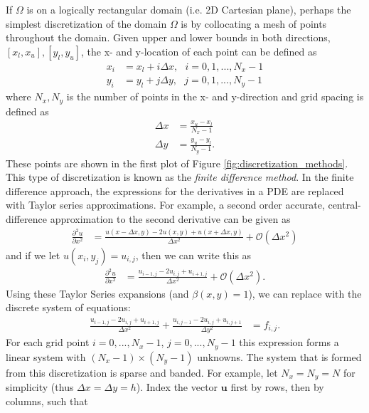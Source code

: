 If $\Omega$ is on a logically rectangular domain (i.e. 2D Cartesian plane), perhaps the simplest discretization of the domain $\Omega$ is by collocating a mesh of points throughout the domain. Given upper and lower bounds in both directions, $[x_l, x_u], [y_l, y_u]$, the x- and y-location of each point can be defined as
\begin{align}
    x_i &= x_l + i \Delta x,\ \ \ i = 0, 1, ..., N_x-1 \\
    y_i &= y_l + j \Delta y,\ \ \ j = 0, 1, ..., N_y-1
\end{align}
where $N_x, N_y$ is the number of points in the x- and y-direction and grid spacing is defined as
\begin{align}
    \Delta x &= \frac{x_u - x_l}{N_x - 1} \\
    \Delta y &= \frac{y_u - y_l}{N_y - 1}.
\end{align}
These points are shown in the first plot of Figure \ref{fig:discretization_methods}. This type of discretization is known as the {\em finite difference method}. In the finite difference approach, the expressions for the derivatives in a PDE are replaced with Taylor series approximations. For example, a second order accurate, central-difference approximation to the second derivative can be given as
\begin{align}
    \frac{\partial^2 u}{\partial x^2} &= \frac{u(x - \Delta x, y) - 2u(x, y) + u(x + \Delta x, y)}{\Delta x^2} + \mathcal{O}(\Delta x^2)
\end{align}
and if we let $u(x_i, y_j) = u_{i,j}$, then we can write this as
\begin{align}
    \frac{\partial^2 u}{\partial x^2} &= \frac{u_{i-1,j} - 2u_{i,j} + u_{i+1,j}}{\Delta x^2} + \mathcal{O}(\Delta x^2).
\end{align}
Using these Taylor Series expansions (and $\beta(x,y) = 1$), we can replace  with the discrete system of equations:
\begin{align}
    \frac{u_{i-1,j} - 2u_{i,j} + u_{i+1,j}}{\Delta x^2} + \frac{u_{i,j-1} - 2u_{i,j} + u_{i,j+1}}{\Delta y^2} &= f_{i,j}.
    \label{eq:poisson_FD}
\end{align}
For each grid point $i = 0, ..., N_x - 1$, $j = 0, ..., N_y - 1$ this expression forms a linear system with $(N_x-1) \times (N_y-1)$ unknowns. The system that is formed from this discretization is sparse and banded. For example, let $N_x = N_y = N$ for simplicity (thus $\Delta x = \Delta y = h$). Index the vector $\textbf{u}$ first by rows, then by columns, such that
